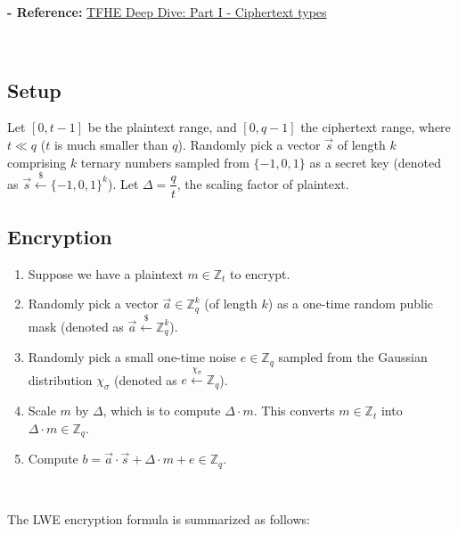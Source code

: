 
\textbf{- Reference:} 
\href{https://www.zama.ai/post/tfhe-deep-dive-part-1}{TFHE Deep Dive: Part I - Ciphertext types}~\cite{tfhe-1}



$ $




\subsection{Setup}
Let $[0, t-1]$ be the plaintext range, and $[0, q-1]$ the ciphertext range, where $t \ll q$ ($t$ is much smaller than $q$). Randomly pick a vector $\vec{s}$ of length $k$ comprising $k$ ternary numbers sampled from $\{-1, 0, 1\}$ as a secret key (denoted as $\vec{s} \xleftarrow{\$} \{-1, 0, 1\}^k$). Let $\Delta = \dfrac{q}{t}$, the scaling factor of plaintext.

\subsection{Encryption}
\label{subsec:lwe-enc}

\begin{enumerate}
\item Suppose we have a plaintext $m \in \mathbb{Z}_t$ to encrypt. \item Randomly pick a vector $\vec{a} \in \mathbb{Z}_q^k$ (of length $k$) as a one-time random public mask (denoted as $\vec{a} \xleftarrow{\$} \mathbb{Z}_q^k$).
\item Randomly pick a small one-time noise $e \in \mathbb{Z}_q$ sampled from the Gaussian distribution $\chi_\sigma$ (denoted as $e \xleftarrow{\chi_\sigma} \mathbb{Z}_q$). 
\item Scale $m$ by $\Delta$, which is to compute $\Delta \cdot m$. This converts $m \in \mathbb{Z}_t$ into $\Delta \cdot m \in \mathbb{Z}_q$.
\item Compute $b = \vec{a} \cdot \vec{s} + \Delta \cdot m + e \in \mathbb{Z}_q$. 
\end{enumerate}

$ $

The LWE encryption formula is summarized as follows:

$ $


